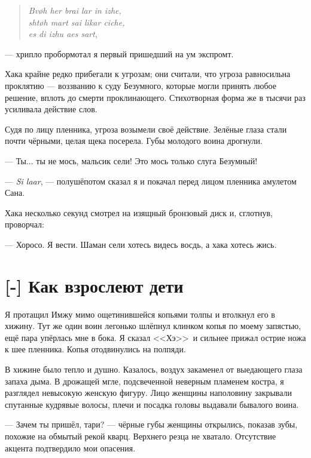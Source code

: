 \begin{verse}
\textit{Bv\o{}h her brai lar in izhe,}\\
\textit{sht\o{}h mart sai likar ciche,}\\
\textit{es di izhu aes sart}\FM,
\end{verse}

--- хрипло пробормотал я первый пришедший на ум экспромт.

Хака крайне редко прибегали к угрозам;
они считали, что угроза равносильна проклятию --- воззванию к суду Безумного, которые могли принять любое решение, вплоть до смерти проклинающего.
Стихотворная форма же в тысячи раз усиливала действие слов.

Судя по лицу пленника, угроза возымели своё действие.
Зелёные глаза стали почти чёрными, целая щека посерела.
Губы молодого воина дрогнули.

--- Ты... ты не мось, мальсик сели!
Это мось только слуга Безумный!

--- \textit{Si laar}\FM, --- полушёпотом сказал я и покачал перед лицом пленника амулетом Сана.

Хака несколько секунд смотрел на изящный бронзовый диск и, сглотнув, проворчал:

--- Хоросо.
Я вести.
Шаман сели хотесь видесь восдь, а хака хотесь жись.

\section{[-] Как взрослеют дети}

\textspace

Я протащил Имжу мимо ощетинившейся копьями толпы и втолкнул его в хижину.
Тут же один воин легонько шлёпнул клинком копья по моему запястью, ещё пара упёрлась мне в бока.
Я сказал <<Хэ>>\FM\ и сильнее прижал острие ножа к шее пленника.
Копья отодвинулись на полпяди.

В хижине было тепло и душно.
Казалось, воздух закаменел от выедающего глаза запаха дыма.
В дрожащей мгле, подсвеченной неверным пламенем костра, я разглядел невысокую женскую фигуру.
Лицо женщины наполовину закрывали спутанные кудрявые волосы, плечи и посадка головы выдавали бывалого воина.

--- Зачем ты пришёл, тари? --- чёрные губы женщины открылись, показав зубы, похожие на обмытый рекой кварц.
Верхнего резца не хватало.
Отсутствие акцента подтвердило мои опасения.

